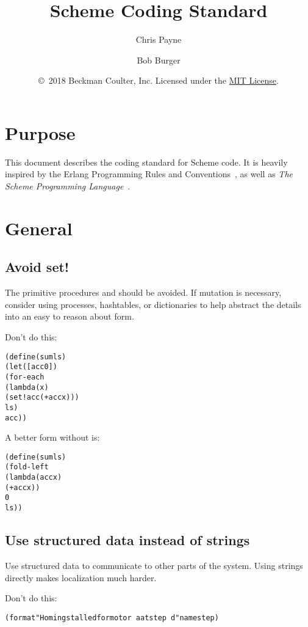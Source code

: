 \documentclass[letterpaper,11pt,twoside,final]{article}
\begin{document}
\title {Scheme Coding Standard}
\author {Chris Payne \and Bob Burger}
\date {\copyright\ 2018 Beckman Coulter, Inc.
  Licensed under the \href{https://opensource.org/licenses/MIT}{MIT License}.}
\coverpage

\section* {Purpose}

This document describes the coding standard for Scheme code.  It is
heavily inspired by the Erlang Programming Rules and
Conventions~\cite{erlang-programming-rules}, as well as \emph{The
  Scheme Programming Language}~\cite{the-scheme-programming-language}.

\section* {General}

\subsection* {Avoid set!}

The primitive procedures  and  should
be avoided. If mutation is necessary, consider using processes,
hashtables, or dictionaries to help abstract the details into an easy
to reason about form.

Don't do this:
\antipar
\begin{alltt}
(define (sum ls)
  (let ([acc 0])
    (for-each
     (lambda (x)
       (set! acc (+ acc x)))
     ls)
    acc))
\end{alltt}

A better form without  is:
\antipar
\begin{alltt}
(define (sum ls)
  (fold-left
   (lambda (acc x)
     (+ acc x))
   0
   ls))
\end{alltt}

\subsection* {Use structured data instead of strings}

Use structured data to communicate to other parts of the system. Using
strings directly makes localization much harder.

Don't do this:
\antipar
\begin{alltt}
(format "Homing stalled for motor ~a at step ~d" name step)
\end{alltt}
\end{document}
